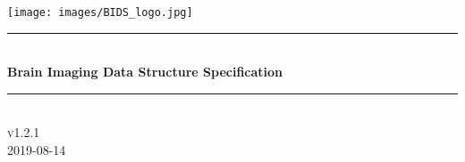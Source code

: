 \begin{titlepage}

\newcommand{\HRule}{\rule{\linewidth}{0.5mm}} %

\center %




\texttt{[image: images/BIDS\_logo.jpg]}\\[1cm] 


\HRule \\[0.4cm]
{ \huge \bfseries Brain Imaging Data Structure Specification}\\[0.4cm] %
\HRule \\[1.5cm]


\textsc{\large v1.2.1}\\[0.5cm]{\large 2019-08-14}\\[2cm]\vfill\end{titlepage}